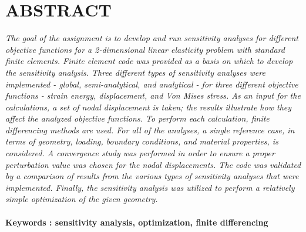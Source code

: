 \section*{\normalsize{ABSTRACT}}


\textit{The goal of the assignment is to develop and run sensitivity analyses for different objective functions for a 2-dimensional linear elasticity problem with standard finite elements. Finite element code was provided as a basis on which to develop the sensitivity analysis. Three different types of sensitivity analyses were implemented - global, semi-analytical, and analytical - for three different objective functions - strain energy, displacement, and Von Mises stress.  As an input for the calculations, a set of nodal displacement is taken; the results illustrate how they affect the analyzed objective functions. To perform each calculation, finite differencing methods are used. For all of the analyses, a single reference case, in terms of geometry, loading, boundary conditions, and material properties, is considered. A convergence study was performed in order to ensure a proper perturbation value was chosen for the nodal displacements. The code was validated by a comparison of results from the various types of sensitivity analyses that were implemented. Finally, the sensitivity analysis was utilized to perform a relatively simple optimization of the given geometry.}\\

\paragraph*{Keywords : sensitivity analysis, optimization, finite differencing}